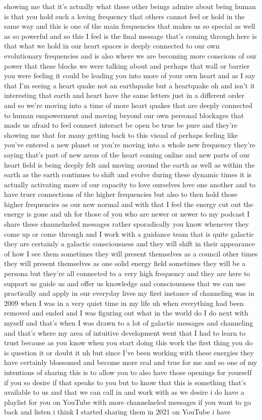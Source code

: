 \documentclass{article}
\begin{document}
showing me that it's actually what these other beings admire about being human is that you hold such a loving frequency that others cannot feel or hold in the same way and this is one of the main frequencies that makes us so special as well as so powerful and so this I feel is the final message that's coming through here is that what we hold in our heart spaces is deeply connected to our own evolutionary frequencies and is also where we are becoming more conscious of our power that these blocks we were talking about and perhaps that wall or barrier you were feeling it could be leading you into more of your own heart and as I say that I'm seeing a heart quake not an earthquake but a heartquake oh and isn't it interesting that earth and heart have the same letters just in a different order and so we're moving into a time of more heart quakes that are deeply connected to human empowerment and moving beyond our own personal blockages that made us afraid to feel connect interact be open be true be pure and they're showing me that for many getting back to this visual of perhaps feeling like you've entered a new planet or you're moving into a whole new frequency they're saying that's part of new areas of the heart coming online and new parts of our heart field is being deeply felt and moving around the earth as well as within the earth as the earth continues to shift and evolve during these dynamic times it is actually activating more of our capacity to love ourselves love one another and to have truer connections of the higher frequencies but also to then hold those higher frequencies as our new normal and with that I feel the energy cut out the energy is gone and uh for those of you who are newer or newer to my podcast I share these channelneled messages rather sporadically you know whenever they come up or come through and I work with a guidance team that is quite galactic they are certainly a galactic consciousness and they will shift in their appearance of how I see them sometimes they will present themselves as a council other times they will present themselves as one solid energy field sometimes they will be a persona but they're all connected to a very high frequency and they are here to support us guide us and offer us knowledge and consciousness that we can use practically and apply in our everyday lives my first instance of channeling was in 2009 when I was in a very quiet time in my life uh when everything had been removed and ended and I was figuring out what in the world do I do next with myself and that's when I was drawn to a lot of galactic messages and channeling and that's where my area of intuitive development went that I had to learn to trust because as you know when you start doing this work the first thing you do is question it or doubt it uh but since I've been working with these energies they have certainly blossomed and become more real and true for me and so one of my intentions of sharing this is to allow you to also have those openings for yourself if you so desire if that speaks to you but to know that this is something that's available to us and that we can call in and work with as we desire i do have a playlist for you on YouTube with more channelneled messages if you want to go back and listen i think I started sharing them in 2021 on YouTube i have 
\end{document}
